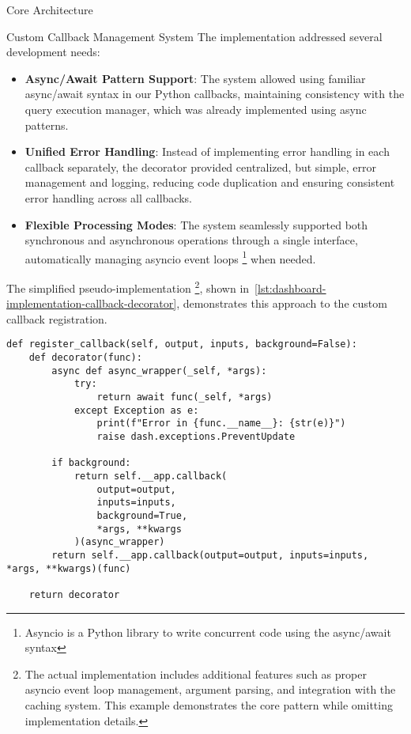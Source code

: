 \begin{section}{Core Architecture}
\begin{subsection}{Custom Callback Management System}
		The implementation addressed several development needs:
		\begin{itemize}
			\item \textbf{Async/Await Pattern Support}: The system allowed using familiar async/await syntax in our Python callbacks, maintaining consistency with the query execution manager, which was already implemented using async
			patterns.
			\item \textbf{Unified Error Handling}: Instead of implementing error handling in each callback separately, the decorator provided centralized, but simple, error management and logging, reducing code duplication and ensuring
			consistent error handling across all callbacks.
			\item \textbf{Flexible Processing Modes}: The system seamlessly supported both synchronous and asynchronous operations through a single interface, automatically managing asyncio event loops
			\footnote{Asyncio is a Python library to write concurrent code using the async/await syntax\cite{psf_library_asyncio}} when needed.
		\end{itemize}

		The simplified pseudo-implementation
		\footnote{
			The actual implementation includes additional features such as proper asyncio event loop management, argument parsing, and integration with the caching system.
			This example demonstrates the core pattern while omitting implementation details.}, shown in~\autoref{lst:dashboard-implementation-callback-decorator}, demonstrates this approach to the custom callback registration.

		\begin{listing}[H]
			\caption{Custom Callback Decorator Implementation}
			\begin{verbatim}
def register_callback(self, output, inputs, background=False):
	def decorator(func):
		async def async_wrapper(_self, *args):
			try:
				return await func(_self, *args)
			except Exception as e:
				print(f"Error in {func.__name__}: {str(e)}")
				raise dash.exceptions.PreventUpdate

		if background:
			return self.__app.callback(
				output=output,
				inputs=inputs,
				background=True,
				*args, **kwargs
			)(async_wrapper)
		return self.__app.callback(output=output, inputs=inputs, *args, **kwargs)(func)

	return decorator
			\end{verbatim}
			\label{lst:dashboard-implementation-callback-decorator}
		\end{listing}


\end{subsection}
\end{section}
